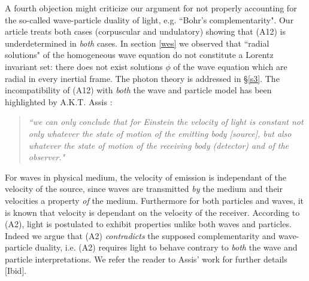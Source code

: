 \documentclass[12pt]{amsart}
\begin{document}
A fourth objection might criticize our argument for not properly accounting for the so-called wave-particle duality of light, e.g. ``Bohr's complementarity". Our article treats both cases (corpuscular and undulatory) showing that (A12) is underdetermined in \emph{both} cases. In section \ref{wes} we observed that ``radial solutions" of the homogeneous wave equation do not constitute a Lorentz invariant set: there does not exist solutions $\phi$ of the wave equation which are radial in every inertial frame. The photon theory is addressed in \S \ref{s3}. The incompatibility of (A12) with \emph{both} the wave and particle model has been highlighted by A.K.T. Assis \cite[\S 7.2.4, pp.133]{assis1999relational}:  
\begin{quote} \emph{``we can only conclude that for Einstein the velocity of light is constant not only whatever the state of motion of the emitting body [source], but also whatever the state of motion of the receiving body (detector) and of the observer."} 
\end{quote}
For waves in physical medium, the velocity of emission is independant of the velocity of the source, since waves are transmitted \emph{by} the medium and their velocities a property \emph{of} the medium. Furthermore for both particles and waves, it is known that velocity is dependant on the velocity of the receiver. According to (A2), light is postulated to exhibit properties unlike both waves and particles. Indeed we argue that (A2) \emph{contradicts} the supposed complementarity and wave-particle duality, i.e.  (A2) requires light to behave contrary to \emph{both} the wave and particle interpretations. We refer the reader to Assis' work for further details [Ibid].












\end{document}
